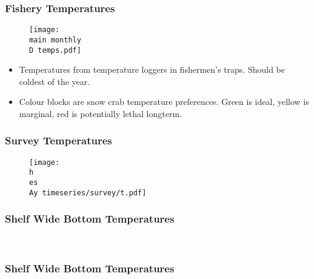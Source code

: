 \documentclass{beamer}
\numberwithin{equation}{section}		%
\numberwithin{figure}{section}	   	%
\numberwithin{table}{section}				%
\newcommand{\D}{.}  %
\newcommand{\h}{C:/} %
\newcommand{\es}{bio.data/bio.snowcrab/} %
\newcommand{\Ay}{assessments/2017/}
\newcommand{\main}{C:/bio.data/bio.snowcrab/assessments/2018/presentations/4X/}
\begin{document}
\begin{frame}
\frametitle{Fishery Temperatures}
\begin{figure}
	
	\centerline{\texttt{[image: \\main monthly\\D temps.pdf]}}
	
\end{figure}

\begin{itemize}
\item Temperatures from temperature loggers in fishermen's traps. Should be coldest of the year.
\item Colour blocks are snow crab temperature preferences. Green is ideal, yellow is marginal, red is potentially lethal longterm.
\end{itemize}
\end{frame}

\begin{frame}
\frametitle{Survey Temperatures}
\begin{figure}

\centerline{\texttt{[image: \\h \\es \\Ay timeseries/survey/t.pdf]}}

\end{figure}
\end{frame}
%
%

\begin{frame}
\frametitle{Shelf Wide Bottom Temperatures}
\begin{figure}
	\centering
	\
	\
	\
	\
\end{figure}
\end{frame}

\begin{frame}
\frametitle{Shelf Wide Bottom Temperatures}
\begin{figure}
	\centering
	\
\end{figure}
\end{frame}
\end{document}
